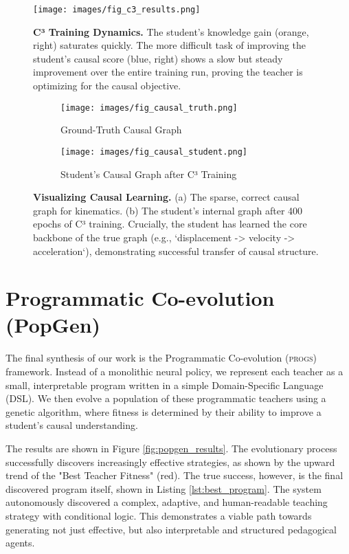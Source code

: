 \documentclass[11pt, letterpaper]{article}
\newcommand{\framework}[1]{\textsc{#1}}
\newcommand{\progs}{\framework{progs}}
\begin{document}
\begin{figure}[h!]
    \centering
    \texttt{[image: images/fig\_c3\_results.png]}
    \caption{\textbf{C³ Training Dynamics.} The student's knowledge gain (orange, right) saturates quickly. The more difficult task of improving the student's causal score (blue, right) shows a slow but steady improvement over the entire training run, proving the teacher is optimizing for the causal objective.}
    \label{fig:c3_results}
\end{figure}

\begin{figure}[h!]
    \centering
    \begin{subfigure}{0.48\textwidth}
        \texttt{[image: images/fig\_causal\_truth.png]}
        \caption{Ground-Truth Causal Graph}
        \label{fig:causal_truth}
    \end{subfigure}
    \hfill
    \begin{subfigure}{0.48\textwidth}
        \texttt{[image: images/fig\_causal\_student.png]}
        \caption{Student's Causal Graph after C³ Training}
        \label{fig:causal_student}
    \end{subfigure}
    \caption{\textbf{Visualizing Causal Learning.} (a) The sparse, correct causal graph for kinematics. (b) The student's internal graph after 400 epochs of C³ training. Crucially, the student has learned the core backbone of the true graph (e.g., `displacement -> velocity -> acceleration`), demonstrating successful transfer of causal structure.}
    \label{fig:causal_graphs}
\end{figure}

\section{Programmatic Co-evolution (PopGen)}
The final synthesis of our work is the Programmatic Co-evolution (\progs{}) framework. Instead of a monolithic neural policy, we represent each teacher as a small, interpretable program written in a simple Domain-Specific Language (DSL). We then evolve a population of these programmatic teachers using a genetic algorithm, where fitness is determined by their ability to improve a student's causal understanding.

The results are shown in Figure \ref{fig:popgen_results}. The evolutionary process successfully discovers increasingly effective strategies, as shown by the upward trend of the "Best Teacher Fitness" (red). The true success, however, is the final discovered program itself, shown in Listing \ref{lst:best_program}. The system autonomously discovered a complex, adaptive, and human-readable teaching strategy with conditional logic. This demonstrates a viable path towards generating not just effective, but also interpretable and structured pedagogical agents.
\end{document}
